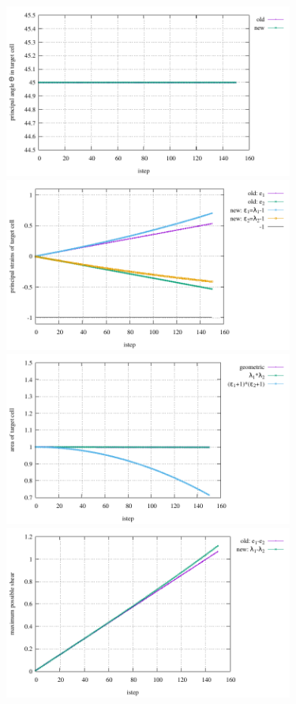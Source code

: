 \begin{center}
\includegraphics[width=9.5cm]{python_codes/fieldstone_89/results/pureshear/principal_angle.pdf}
\includegraphics[width=9.5cm]{python_codes/fieldstone_89/results/pureshear/principal_strains.pdf}\\
\includegraphics[width=9.5cm]{python_codes/fieldstone_89/results/pureshear/area.pdf}
\includegraphics[width=9.5cm]{python_codes/fieldstone_89/results/pureshear/maximum_shear.pdf}\\

\end{center}
